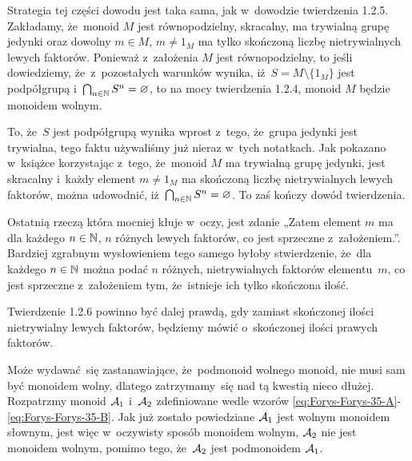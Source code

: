\documentclass[a4paper,11pt]{article}
\begin{document}
Strategia tej części dowodu jest taka sama, jak w~dowodzie twierdzenia
1.2.5. Zakładamy, że~monoid $M$ jest równopodzielny, skracalny, ma
trywialną grupę jedynki oraz dowolny $m \in M$, $m \neq 1_{ M }$ ma
tylko skończoną liczbę nietrywialnych lewych faktorów. Ponieważ
z~założenia $M$ jest równopodzielny, to jeśli dowiedziemy,
że~z~pozostałych warunków wynika, iż~$S = M \setminus \{ 1_{ M } \}$
jest podpółgrupą i~$\bigcap_{ n \in \mathbb{N} } S^{ n } = \varnothing$, to na
mocy twierdzenia 1.2.4, monoid $M$ będzie monoidem wolnym.

To, że~$S$ jest podpółgrupą wynika wprost z~tego, że~grupa jedynki
jest trywialna, tego faktu używaliśmy już nieraz w~tych notatkach. Jak
pokazano w~książce korzystając z~tego, że~monoid $M$ ma trywialną
grupę jedynki, jest skracalny i~każdy element $m \neq 1_{ M }$ ma
skończoną liczbę nietrywialnych lewych faktorów, można udowodnić,
iż~$\bigcap_{ n \in \mathbb{N} } S^{ n } = \varnothing$. To zaś kończy dowód twierdzenia.

Ostatnią rzeczą która mocniej kłuje w~oczy, jest zdanie „Zatem element
$m$ ma dla każdego $n \in \mathbb{N}$, $n$ różnych lewych faktorów, co jest
sprzeczne z~założeniem.”. Bardziej zgrabnym wysłowieniem tego samego
byłoby stwierdzenie, że~dla każdego $n \in \mathbb{N}$ można podać $n$
różnych, nietrywialnych faktorów elementu~$m$, co jest sprzeczne
z~założeniem tym, że~istnieje ich tylko skończona ilość.

\vspace{\spaceFour}





\start {} Twierdzenie 1.2.6 powinno być dalej prawdą, gdy
zamiast skończonej ilości nietrywialny lewych faktorów, będziemy mówić
o~skończonej ilości prawych faktorów.

\vspace{\spaceFour}





\start {} Może wydawać~się zastanawiające, że~podmonoid wolnego
monoid, nie musi sam być monoidem wolny, dlatego zatrzymamy~się nad tą
kwestią nieco dłużej. Rozpatrzmy monoid $\mathcal{A}_{ 1 }$ i~$\mathcal{A}_{ 2 }$
zdefiniowane wedle wzorów
\eqref{eq:Forys-Forys-35-A}-\eqref{eq:Forys-Forys-35-B}. Jak już
zostało powiedziane $\mathcal{A}_{ 1 }$ jest wolnym monoidem słownym, jest
więc w~oczywisty sposób monoidem wolnym, $\mathcal{A}_{ 2 }$ nie jest
monoidem wolnym, pomimo tego, że~$\mathcal{A}_{ 2 }$ jest podmonoidem
$\mathcal{A}_{ 1 }$.
\end{document}
